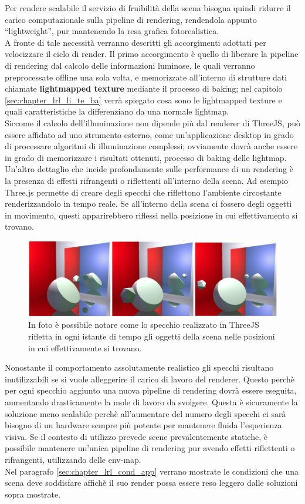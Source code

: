 Per rendere scalabile il servizio di fruibilità della scena bisogna quindi ridurre il carico computazionale sulla pipeline di rendering, rendendola appunto “lightweight”, pur mantenendo la resa grafica fotorealistica.
\\
A fronte di tale necessità verranno descritti gli accorgimenti adottati per velocizzare il ciclo di render.
Il primo accorgimento è quello di liberare la pipeline di rendering dal calcolo delle informazioni luminose, le quali verranno preprocessate offline una sola volta, e memorizzate all’interno di strutture dati chiamate \textbf{lightmapped texture} mediante il processo di baking; nel capitolo \ref{sec:chapter_lrl_li_te_ba} verrà spiegato cosa sono le lightmapped texture e quali caratteristiche la differenziano da una normale lightmap. 
\\
Siccome il calcolo dell’illuminazione non dipende più dal renderer di ThreeJS, può essere affidato ad uno strumento esterno, come un’applicazione desktop in grado di processare algoritmi di illuminazione complessi; ovviamente dovrà anche essere in grado di memorizzare i risultati ottenuti, processo di baking delle lightmap.
\\
Un’altro dettaglio che incide profondamente sulle performance di un rendering è la presenza di effetti rifrangenti o riflettenti all’interno della scena. Ad esempio Three.js permette di creare degli specchi che riflettono l’ambiente circostante renderizzandolo in tempo reale.
Se all’interno della scena ci fossero degli oggetti in movimento, questi apparirebbero riflessi nella posizione in cui effettivamento si trovano.
\\
\begin{figure}[htb]
 \centering
 \includegraphics[width=0.8\linewidth]{images/chapter_lrl/lrl_specchio.png}\hfill
 \caption[ThreeJS Mirror]{In foto è possibile notare come lo specchio realizzato in ThreeJS rifletta in ogni istante di tempo gli oggetti della scena nelle posizioni in cui effettivamente si trovano.}
 \label{fig:lrl_specchio}
\end{figure}
Nonostante il comportamento assolutamente realistico gli specchi risultano inutilizzabili se si vuole  alleggerire il carico di lavoro del renderer. Questo perchè per ogni specchio aggiunto una nuova pipeline di rendering dovrà essere eseguita, aumentando drasticamente la mole di lavoro da svolgere. Questa è sicuramente la soluzione meno scalabile perchè all’aumentare del numero degli specchi ci sarà bisogno di un hardware sempre più potente per mantenere fluida l’esperienza visiva. Se il contesto di utilizzo prevede scene prevalentemente statiche, è possibile  mantenere un’unica pipeline di rendering pur avendo effetti riflettenti o rifrangenti, utilizzando delle env-map. 
\\
Nel paragrafo \ref{sec:chapter_lrl_cond_app} verrano mostrate le condizioni che una scena deve soddisfare affichè il suo render possa essere reso leggero dalle soluzioni sopra mostrate.
